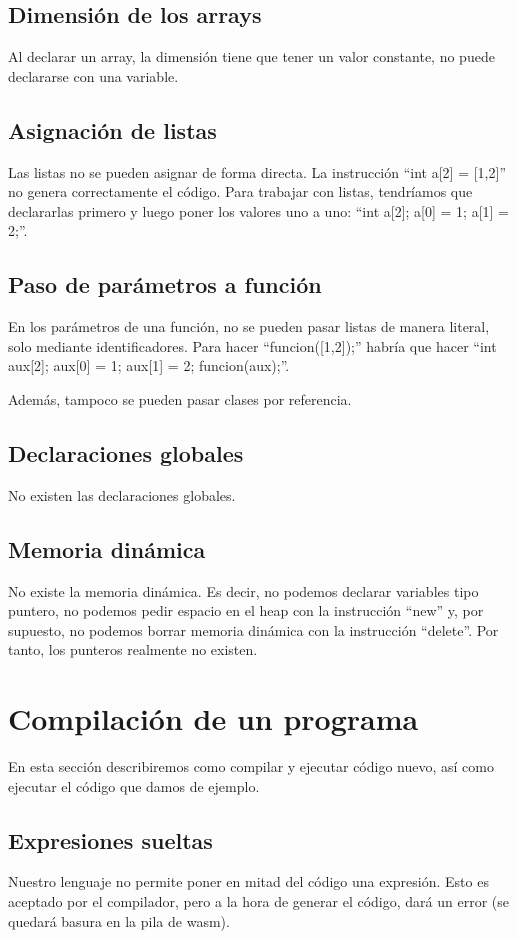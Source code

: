 \documentclass{article}
\begin{document}
\subsection{Dimensión de los arrays}
Al declarar un array, la dimensión tiene que tener un valor constante, no puede declararse con una variable.

\subsection{Asignación de listas}
Las listas no se pueden asignar de forma directa. La instrucción ``int a[2] = [1,2]'' no genera correctamente el código. Para trabajar con listas, tendríamos que declararlas primero y luego poner los valores uno a uno: ``int a[2]; a[0] = 1; a[1] = 2;''.

\subsection{Paso de parámetros a función}
En los parámetros de una función, no se pueden pasar listas de manera literal, solo mediante identificadores. Para hacer ``funcion([1,2]);'' habría que hacer ``int aux[2]; aux[0] = 1; aux[1] = 2; funcion(aux);''.

Además, tampoco se pueden pasar clases por referencia.

\subsection{Declaraciones globales}
No existen las declaraciones globales.

\subsection{Memoria dinámica}
No existe la memoria dinámica. Es decir, no podemos declarar variables tipo puntero, no podemos pedir espacio en el heap con la instrucción ``new'' y, por supuesto, no podemos borrar memoria dinámica con la instrucción ``delete''. Por tanto, los punteros realmente no existen.

\section{Compilación de un programa}
En esta sección describiremos como compilar y ejecutar código nuevo, así como ejecutar el código que damos de ejemplo.

\subsection{Expresiones sueltas}
Nuestro lenguaje no permite poner en mitad del código una expresión. Esto es aceptado por el compilador, pero a la hora de generar el código, dará un error (se quedará basura en la pila de wasm).
\end{document}
